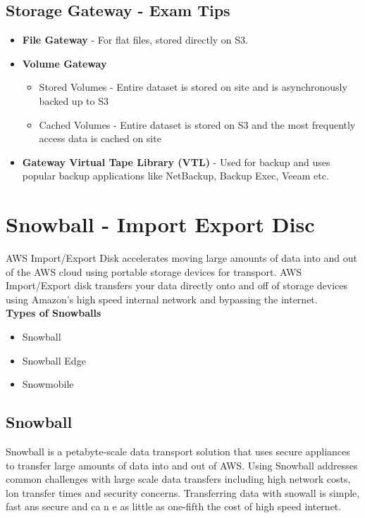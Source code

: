 \documentclass{article}
\begin{document}
\subsection*{Storage Gateway - Exam Tips}
\begin{itemize}
\item
\textbf{File Gateway} - For flat files, stored directly on S3.
\item
\textbf{Volume Gateway}
	\begin{itemize}
	\item
	Stored Volumes - Entire dataset is stored on site and is asynchronously backed up to S3

	\item
	Cached Volumes - Entire dataset is stored on S3 and the most frequently access data is cached on site
	\end{itemize}
\item
\textbf{Gateway Virtual Tape Library (VTL)} - Used for backup and uses popular backup applications like NetBackup, Backup Exec, Veeam etc.
\end{itemize}


\section{Snowball - Import Export Disc}
AWS Import/Export Disk accelerates moving large amounts of data into and out of the AWS cloud using portable storage devices for transport. AWS Import/Export disk transfers your data directly onto and off of storage devices using Amazon's high speed internal network and bypassing the internet. \\

\textbf{Types of Snowballs}
\begin{itemize}

\item
Snowball

\item
Snowball Edge

\item
Snowmobile
\end{itemize}

\subsection{Snowball}
Snowball is a petabyte-scale data transport solution that uses secure appliances to transfer large amounts of data into and out of AWS. Using Snowball addresses common challenges with large scale data transfers including high network costs, lon transfer times and security concerns. Transferring data with snowall is simple, fast ans secure and ca n e as little as one-fifth the cost of high speed internet.
\end{document}
